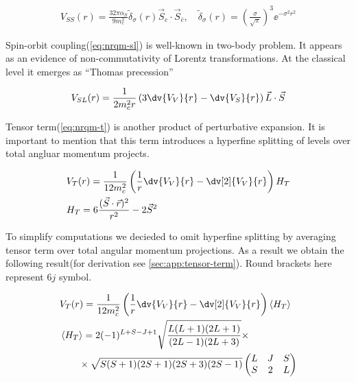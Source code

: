 \begin{align} \label{eq:nrqm-ss}
    V_{SS}(r) = \frac{32 \pi \alpha_S}{9 m_c^2} \tilde{\delta}_\sigma(r) \vec{S}_c \cdot \vec{S}_{\bar{c}},\quad \tilde{\delta}_\sigma(r) = \left(\frac{\sigma}{\sqrt{\pi}}\right)^3 \ee^{-\sigma^2 r^2}
\end{align}

Spin-orbit coupling(\cref{eq:nrqm-sl}) is well-known in two-body problem. It appears as an evidence of non-commutativity of Lorentz transformations. At the classical level it emerges as ``Thomas precession''~\cite{thomas}

\begin{align} \label{eq:nrqm-sl}
    V_{SL}(r) = \frac{1}{2 m_c^2 r} \left( 3 \dv{V_V}{r} - \dv{V_S}{r} \right) \vec{L} \cdot \vec{S}
\end{align}

Tensor term(\cref{eq:nrqm-t}) is another product of perturbative expansion. It is important to mention that this term introduces a hyperfine splitting of levels over total angluar momentum projects.

\begin{align} \label{eq:nrqm-t}
    &V_T(r) = \frac{1}{12 m_c^2} \left( \frac{1}{r} \dv{V_V}{r} - \dv[2]{V_V}{r} \right) H_T \\
    &H_T = 6\frac{(\vec{S} \cdot \vec{r})^2}{r^2} - 2\vec{S}^2
\end{align}

To simplify computations we decieded to omit hyperfine splitting by averaging tensor term over total angular momentum projections. As a result we obtain the following result(for derivation see \cref{sec:app:tensor-term}). Round brackets here represent $6j$ symbol.

\begin{align}
    &V_T(r) = \frac{1}{12 m_c^2} \left( \frac{1}{r} \dv{V_V}{r} - \dv[2]{V_V}{r} \right) \left<H_T\right> \\
    &\left<H_T\right> = 2 (-1)^{L+S-J+1} \sqrt{\frac{L(L+1)(2L+1)}{(2L-1)(2L+3)}} \times \nonumber \\
    &\qquad \times \sqrt{S(S+1)(2S+1)(2S+3)(2S-1)} \left( \begin{matrix}
                                                L & J & S \\
                                                S & 2 & L
                                              \end{matrix} \right)
\end{align}

